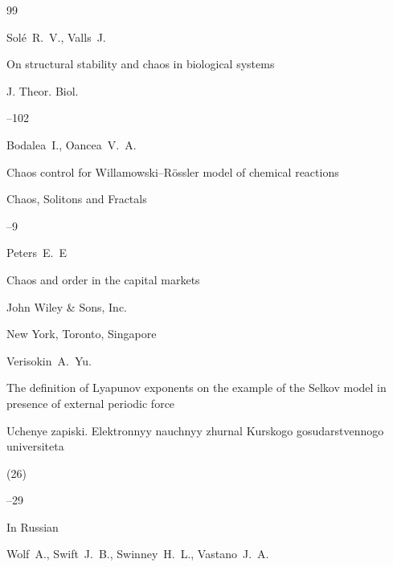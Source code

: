 \begin{thebibliography}{99}




\by Sol\'e~R.~V., Valls~J.

\paper On structural stability and chaos in biological systems

\jour J. Theor. Biol.




--102





\by Bodalea~I., Oancea~V.~A.

\paper  Chaos control for Willamowski--R\"ossler model of chemical reactions 

\jour Chaos, Solitons and Fractals



--9





\by Peters~E.~E

\book Chaos and order in the capital markets


\publ John Wiley \& Sons, Inc.

\publaddr New York, Toronto, Singapore





\by Verisokin~A.~Yu. 

\paper The definition of Lyapunov exponents on the example of the Selkov model in presence of external periodic force

\jour Uchenye zapiski. Elektronnyy nauchnyy zhurnal Kurskogo gosudarstvennogo universiteta


(26)

--29

\lang In Russian




\by Wolf~A., Swift~J.~B.,    Swinney~H.~L.,  Vastano~J.~A.


\end{thebibliography}
